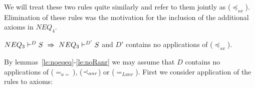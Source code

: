 We will treat these two rules quite similarly and refer to them jointly as ($\preceq_{sx}$). Elimination of these rules was the motivation for the inclusion of the
additional axioms in $NEQ_4$.
\begin{LEMMA}\label{le:noInclsx}
 ${NEQ_{3}}\vdash^{{D}}S\ \mathrel\Rightarrow\ {NEQ_{3}}\vdash^{{D'}}S$ and $D'$ contains no applications
 of ($\preceq_{sx}$). 
\end{LEMMA}
\begin{PROOF}
By lemmas~\ref{le:noeqeq}-\ref{le:noRanr} we may assume that $D$ contains no
applications of ($=_{a=}$), ($\mathbin{\prec}_{anr}$) or ($=_{Lanr}$). 
First we consider application of the rules to axioms:
\begin{LS}

\end{LS}
\end{PROOF}
